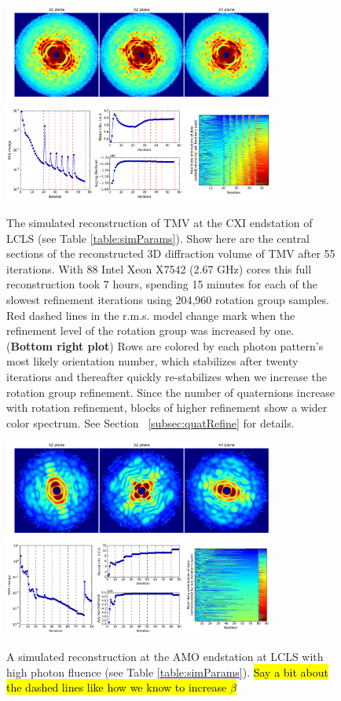 \documentclass[preprint]{iucr}              %
\begin{document}
\begin{figure}
\caption{The simulated reconstruction of TMV at the CXI endstation of LCLS (see Table \ref{table:simParams}). Show here are the central sections of the reconstructed 3D diffraction volume of TMV after 55 iterations. With 88 Intel Xeon X7542 (2.67 GHz) cores this full reconstruction took 7 hours, spending 15 minutes for each of the slowest refinement iterations using 204,960 rotation group samples. Red dashed lines in the r.m.s. model change mark when the refinement level of the rotation group was increased by one. ({\bf Bottom right plot}) Rows are colored by each photon pattern's most likely orientation number, which stabilizes after twenty iterations and thereafter quickly re-stabilizes when we increase the rotation group refinement. Since the number of quaternions increase with rotation refinement, blocks of higher refinement show a wider color spectrum. See Section ~\ref{subsec:quatRefine} for details.}
\includegraphics[width=3.5in]{figures/cxi_intens_055.png} \label{fig:cxi_intens}
\includegraphics[width=3.5in]{figures/cxi_log_fig.png} \label{fig:cxi_log}
\end{figure}

\begin{figure}
\caption{A simulated reconstruction at the AMO endstation at LCLS with high photon fluence (see Table \ref{table:simParams}). \hl{Say a bit about the dashed lines like how we know to increase $\beta$}}
\includegraphics[width=3.5in]{figures/amo_high_intens.png} \label{fig:amo_high_intens}
\includegraphics[width=3.5in]{figures/amo_high_log.png} \label{fig:amo_high_log}
\end{figure}
\end{document}
